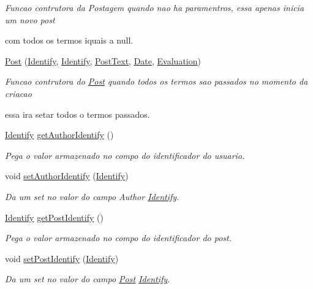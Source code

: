 \begin{DoxyCompactItemize}
\begin{DoxyCompactList}\small\item\em Funcao contrutora da Postagem quando nao ha paramentros, essa apenas inicia um novo post \par
 com todos os termos iquais a null. \end{DoxyCompactList}\item 
\hyperlink{class_post_a6aa3ee41a0187844ea28a6b1870e3e97}{Post} (\hyperlink{class_identify}{Identify}, \hyperlink{class_identify}{Identify}, \hyperlink{class_post_text}{Post\-Text}, \hyperlink{class_date}{Date}, \hyperlink{class_evaluation}{Evaluation})
\begin{DoxyCompactList}\small\item\em Funcao contrutora do \hyperlink{class_post}{Post} quando todos os termos sao passados no momento da criacao \par
 essa ira setar todos o termos passados. \end{DoxyCompactList}\item 
\hyperlink{class_identify}{Identify} \hyperlink{class_post_a57b229252360fa3966d548ffcb83ad11}{get\-Author\-Identify} ()
\begin{DoxyCompactList}\small\item\em Pega o valor armazenado no compo do identificador do usuario. \end{DoxyCompactList}\item 
void \hyperlink{class_post_af08b76053c6703c094e2beaab6dce268}{set\-Author\-Identify} (\hyperlink{class_identify}{Identify})
\begin{DoxyCompactList}\small\item\em Da um set no valor do campo Author \hyperlink{class_identify}{Identify}. \end{DoxyCompactList}\item 
\hyperlink{class_identify}{Identify} \hyperlink{class_post_a69aa08a4b5f53bc66664010fba928880}{get\-Post\-Identify} ()
\begin{DoxyCompactList}\small\item\em Pega o valor armazenado no compo do identificador do post. \end{DoxyCompactList}\item 
void \hyperlink{class_post_a840eea1b1e1fb0a7dae6631064b3d584}{set\-Post\-Identify} (\hyperlink{class_identify}{Identify})
\begin{DoxyCompactList}\small\item\em Da um set no valor do campo \hyperlink{class_post}{Post} \hyperlink{class_identify}{Identify}. \end{DoxyCompactList}\item 

\end{DoxyCompactItemize}
